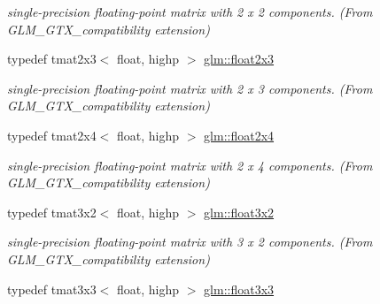 \begin{DoxyCompactItemize}
\begin{DoxyCompactList}\small\item\em single-\/precision floating-\/point matrix with 2 x 2 components. (From G\-L\-M\-\_\-\-G\-T\-X\-\_\-compatibility extension) \end{DoxyCompactList}\item 
\hypertarget{group__gtx__compatibility_gad4078adf5ec44d1878c63bf2962fbe9e}{typedef tmat2x3$<$ float, highp $>$ \hyperlink{group__gtx__compatibility_gad4078adf5ec44d1878c63bf2962fbe9e}{glm\-::float2x3}}\label{group__gtx__compatibility_gad4078adf5ec44d1878c63bf2962fbe9e}

\begin{DoxyCompactList}\small\item\em single-\/precision floating-\/point matrix with 2 x 3 components. (From G\-L\-M\-\_\-\-G\-T\-X\-\_\-compatibility extension) \end{DoxyCompactList}\item 
\hypertarget{group__gtx__compatibility_ga33955674c7eee16728dd45fc10dc9547}{typedef tmat2x4$<$ float, highp $>$ \hyperlink{group__gtx__compatibility_ga33955674c7eee16728dd45fc10dc9547}{glm\-::float2x4}}\label{group__gtx__compatibility_ga33955674c7eee16728dd45fc10dc9547}

\begin{DoxyCompactList}\small\item\em single-\/precision floating-\/point matrix with 2 x 4 components. (From G\-L\-M\-\_\-\-G\-T\-X\-\_\-compatibility extension) \end{DoxyCompactList}\item 
\hypertarget{group__gtx__compatibility_ga2d2b535c9bad9274456ae12676bc6865}{typedef tmat3x2$<$ float, highp $>$ \hyperlink{group__gtx__compatibility_ga2d2b535c9bad9274456ae12676bc6865}{glm\-::float3x2}}\label{group__gtx__compatibility_ga2d2b535c9bad9274456ae12676bc6865}

\begin{DoxyCompactList}\small\item\em single-\/precision floating-\/point matrix with 3 x 2 components. (From G\-L\-M\-\_\-\-G\-T\-X\-\_\-compatibility extension) \end{DoxyCompactList}\item 
\hypertarget{group__gtx__compatibility_ga75c991509a4c4894f10ab480f89e39e7}{typedef tmat3x3$<$ float, highp $>$ \hyperlink{group__gtx__compatibility_ga75c991509a4c4894f10ab480f89e39e7}{glm\-::float3x3}}\label{group__gtx__compatibility_ga75c991509a4c4894f10ab480f89e39e7}


\end{DoxyCompactItemize}
